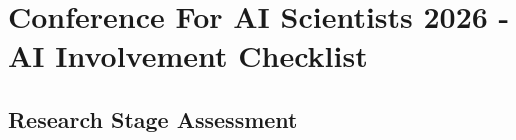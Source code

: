 
\newpage

\section*{Conference For AI Scientists 2026 - AI Involvement Checklist}
\label{checklist_ai_involvement}

\subsection*{Research Stage Assessment}

